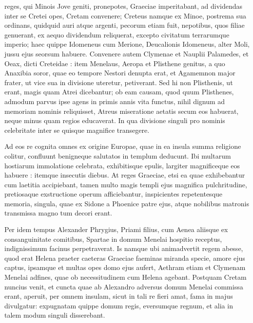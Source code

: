 \documentclass{article}
\begin{document}
\begin{pages}
\begin{Rightside}
{{}} reges, qui Minois Jove geniti, pronepotes, Graeciae imperitabant, ad dividendas inter se Cretei opes, Cretam convenere; Creteus namque ex Minoe, postrema sua ordinans, quidquid auri atque argenti, pecorum etiam fuit, nepotibus, quos filiae genuerant, ex aequo dividendum reliquerat, excepto civitatum terrarumque imperio; haec quippe Idomeneus cum Merione, Deucalionis Idomeneus, alter Moli, jussu ejus seorsum habuere. Convenere autem Clymenae et Nauplii Palamedes, et Oeax, dicti Creteidae : item Menelaus, Aeropa et Plisthene genitus, a quo Anaxibia soror, quae eo tempore Nestori denupta erat, et Agamemnon major frater, ut vice sua in divisione uteretur, petiverant. Sed hi non Plisthenis, ut erant, magis quam Atrei dicebantur; ob eam causam, quod quum Plisthenes, admodum parvus ipse agens in primis annis vita functus, nihil dignum ad memoriam nominis reliquisset, Atreus miseratione aetatis secum eos habuerat, neque minus quam regios educaverat. In qua divisione singuli pro nominis celebritate inter se quisque magnifice transegere.

Ad eos re cognita omnes ex origine Europae, quae in ea insula summa religione colitur, confluunt benigneque salutatos in templum deducunt. Ibi multarum hostiarum immolatione celebrata, exhibitisque epulis, largiter magnificeque eos habuere : itemque insecutis diebus. At reges Graeciae, etsi ea quae exhibebantur cum laetitia accipiebant, tamen multo magis templi ejus magnifica pulchritudine, pretiosaque exstructione operum afficiebantur, inspicientes repetentesque memoria, singula, quae ex Sidone a Phoenice patre ejus, atque nobilibus matronis transmissa magno tum decori erant.

Per idem tempus Alexander Phrygius, Priami filius, cum Aenea aliisque ex consanguinitate comitibus, Spartae in domum Menelai hospitio receptus, indignissimum facinus perpetraverat. Is namque ubi animadvertit regem abesse, quod erat Helena praeter caeteras Graeciae faeminas miranda specie, amore ejus captus, ipsamque et multas opes domo ejus aufert, Aethram etiam et Clymenam Menelai adfines, quae ob necessitudinem cum Helena agebant. Postquam Cretam nuncius venit, et cuncta quae ab Alexandro adversus domum Menelai commissa erant, aperuit, per omnem insulam, sicut in tali re fieri amat, fama in majus divulgatur: expugnatam quippe domum regis, eversumque regnum, et alia in talem modum singuli disserebant.



\end{Rightside}
\end{pages}
\end{document}
